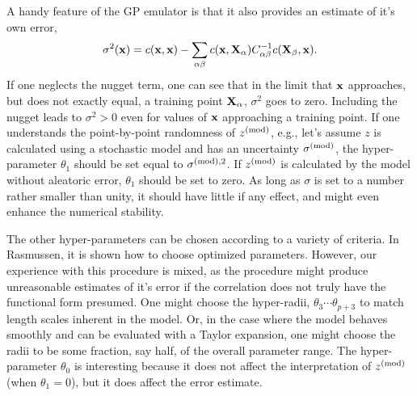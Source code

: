 A handy feature of the GP emulator is that it also provides an estimate of it's own error,
\begin{equation}
\sigma^2({\bf x}) = c({\bf x},{\bf x}) -\sum_{\alpha\beta}c({\bf x},{\bf X}_\alpha)C^{-1}_{\alpha\beta}
c({\bf X}_\beta,{\bf x}).
\end{equation}
If one neglects the nugget term, one can see that in the limit that ${\bf x}$ approaches, but does not exactly equal, a training point ${\bf X}_\alpha$, $\sigma^2$ goes to zero. Including the nugget leads to $\sigma^2>0$ even for values of ${\bf x}$ approaching a training point. If one understands the point-by-point randomness of $z^{\rm(mod)}$, e.g., let's assume $z$ is calculated using a stochastic model and has an uncertainty $\sigma^{\rm(mod)}$, the hyper-parameter $\theta_1$ should be set equal to $\sigma^{{\rm(mod)},2}$. If $z^{\rm(mod)}$ is calculated by the model without aleatoric error, $\theta_1$ should be set to zero. As long as $\sigma$ is set to a number rather smaller than unity, it should have little if any effect, and might even enhance the numerical stability.

The other hyper-parameters can be chosen according to a variety of criteria. In Rasmussen, it is shown how to choose optimized parameters. However, our experience with this procedure is mixed, as the procedure might produce unreasonable estimates of it's error if the correlation does not truly have the functional form presumed. One might choose the hyper-radii, $\theta_3\cdots\theta_{p+3}$ to match length scales inherent in the model. Or, in the case where the model behaves smoothly and can be evaluated with a Taylor expansion, one might choose the radii to be some fraction, say half, of the overall parameter range. The hyper-parameter $\theta_0$ is interesting because it does not affect the interpretation of $z^{\rm(mod)}$ (when $\theta_1=0$), but it does affect the error estimate.

